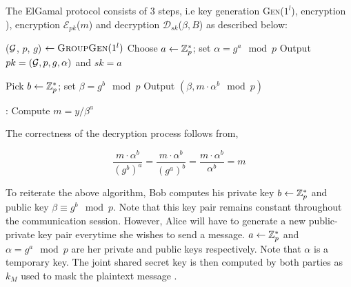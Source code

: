 The ElGamal protocol consists of 3 steps, i.e key generation \textsc{Gen}(\( 1^l \)), encryption \textsc), encryption \( \mathcal{E}_{pk}\)(\( m \)) and decryption \( \mathcal{D}_{sk} \)(\( \beta, B \)) as described below:

\smallskip


\begin{algorithmic}
\STATE ($ \mathcal{G} $, $ p $, $ g $) $ \leftarrow \textsc{GroupGen} (1^l) $ 
\STATE Choose $ a \leftarrow \mathbb{Z}^*_p $; set $ \alpha = g^a \mod p $ 
\STATE Output $ pk = ( \mathcal{G}, p, g, \alpha) $ and $ sk = a $ 
\end{algorithmic} 

\smallskip

\begin{algorithmic}
\STATE Pick $ b \leftarrow \mathbb{Z}^*_p $; set \( \beta = g^b \mod p \)  
\STATE Output $ ( \beta, m \cdot \alpha^b \mod p ) $ 
\end{algorithmic} 

\smallskip

\begin{algorithmic}
:
\STATE Compute $ m = y/\beta^a $ 
\end{algorithmic}

The correctness of the decryption process follows from,

\begin{equation*}
\frac{m \cdot \alpha^b}{(g^b)^a} = \frac{m \cdot \alpha^b}{(g^a)^b} = \frac{m \cdot \alpha^b}{\alpha^b} = m
\end{equation*}

To reiterate the above algorithm, Bob computes his private key \( b \leftarrow \mathbb{Z}^*_p \) and public key \( \beta \equiv g^b \mod p \).
Note that this key pair remains constant throughout the communication session.
However, Alice will have to generate a new public-private key pair everytime she wishes to send a message.
\( a \leftarrow \mathbb{Z}^*_p \) and \( \alpha = g^a \mod p \) are her private and public keys respectively.
Note that \( \alpha \) is a temporary key.
The joint shared secret key is then computed by both parties as \( k_M \) used to mask the plaintext message \cite{paar2009understanding}.

